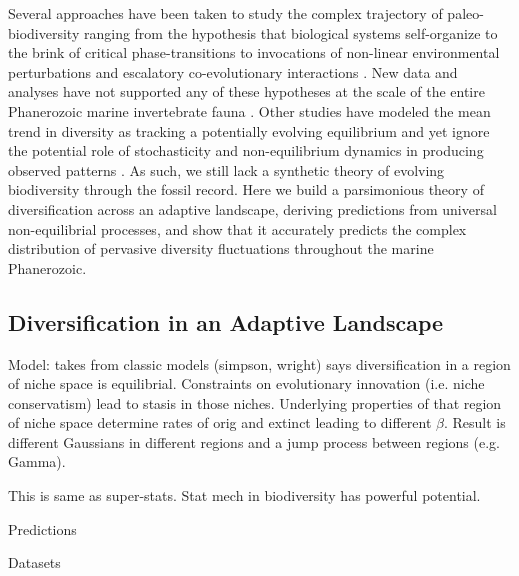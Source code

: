 \documentclass[12pt]{article}
\let\citep=\autocite
\begin{document}
Several approaches have been taken to study the complex trajectory of
paleo-biodiversity ranging from the hypothesis that biological systems
self-organize to the brink of critical phase-transitions
\citep{bak1993, sole1997} to invocations of non-linear environmental
perturbations \citep{newman1995} and escalatory co-evolutionary
interactions \citep{vermeij1987}. New data and analyses have not
supported any of these hypotheses at the scale of the entire
Phanerozoic marine invertebrate fauna \citep{kirchner1998, madin2006,
  alroy08}. Other studies have modeled the mean trend in diversity as
tracking a potentially evolving equilibrium \citep{sepkoski1984,
  alroy08, alroy2010, rabosky2009ecolLett} and yet ignore the
potential role of stochasticity and non-equilibrium dynamics in
producing observed patterns \citep{erwin2012, liow2007,
  quental2013}. As such, we still lack a synthetic theory of evolving
biodiversity through the fossil record.
%
Here we build a parsimonious theory of diversification across an
adaptive landscape, deriving predictions from universal
non-equilibrial processes, and show that it accurately predicts the
complex distribution of pervasive diversity fluctuations throughout
the marine Phanerozoic.

\subsection*{Diversification in an Adaptive Landscape}

Model: takes from classic models (simpson, wright) says
diversification in a region of niche space is equilibrial. Constraints
on evolutionary innovation (i.e. niche conservatism) lead to stasis in
those niches. Underlying properties of that region of niche space
determine rates of orig and extinct leading to different
$\beta$. Result is different Gaussians in different regions and a jump
process between regions (e.g. Gamma).

This is same as super-stats. Stat mech in biodiversity has powerful
potential.

Predictions

Datasets
\end{document}

